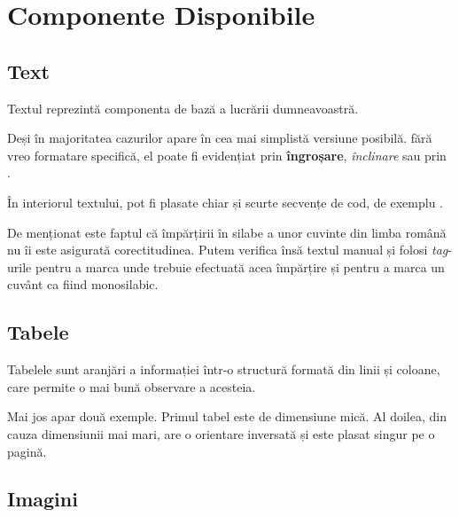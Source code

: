 \documentclass[../../main.tex]{subfiles}
\begin{document}
\chapter{Componente Disponibile}

\section{Text}

Textul reprezintă componenta de bază a lucrării dumneavoastră.

Deși în majoritatea cazurilor apare în cea mai simplistă versiune posibilă. fără vreo formatare specifică, el poate fi evidențiat prin \textbf{îngroșare}, \textit{înclinare} sau prin .

În interiorul textului, pot fi plasate chiar și scurte secvențe de cod, de e\-xemplu .

De menționat este faptul că împărțirii în silabe a unor cuvinte din limba română nu îi este asigurată corectitudinea. Putem verifica însă textul manual și folosi \textit{tag}-urile \inlinecode{\textbackslash -} pentru a marca unde trebuie efectuată acea împărțire și  pentru a marca un cuvânt ca fiind monosilabic.

\section{Tabele}

Tabelele sunt aranjări a informației într-o structură formată din linii și coloane, care permite o mai bună observare a acesteia.

Mai jos apar două exemple. Primul tabel este de dimensiune mică. Al doilea, din cauza dimensiunii mai mari, are o orientare inversată și este plasat singur pe o pagină.



\newpage

\begin{landscape}
    \vspace*{\fill}
    
    \vspace*{\fill}
\end{landscape}

\newpage

\section{Imagini}
\end{document}
